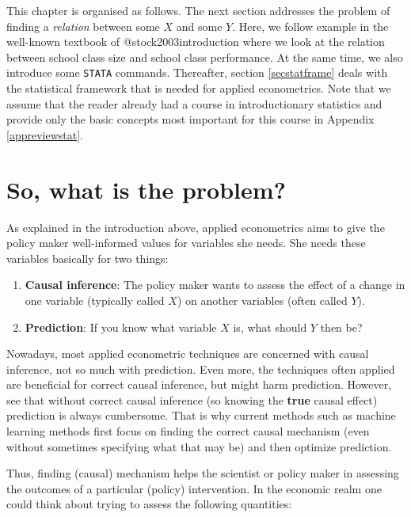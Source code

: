 \documentclass[
]{book}
\providecommand{\tightlist}{%
  \setlength{\itemsep}{0pt}\setlength{\parskip}{0pt}}
\begin{document}
This chapter is organised as follows. The next section addresses the problem of finding a \emph{relation} between some \(X\) and some \(Y\). Here, we follow example in the well-known textbook of @stock2003introduction where we look at the relation between school class size and school class performance. At the same time, we also introduce some \texttt{STATA} commands. Thereafter, section \ref{secstatframe} deals with the statistical framework that is needed for applied econometrics. Note that we assume that the reader already had a course in introductionary statistics and provide only the basic concepts most important for this course in Appendix \ref{appreviewstat}.

\hypertarget{secproblem}{%
\section{So, what is the problem?}\label{secproblem}}

As explained in the introduction above, applied econometrics aims to give the policy maker well-informed values for variables she needs. She needs these variables basically for two things:

\begin{enumerate}
\def\labelenumi{\arabic{enumi}.}
\tightlist
\item
  \textbf{Causal inference}: The policy maker wants to assess the effect of a change in one variable (typically called \(X\)) on another variables (often called \(Y\)).
\item
  \textbf{Prediction}: If you know what variable \(X\) is, what should \(Y\) then be?
\end{enumerate}

Nowadays, most applied econometric techniques are concerned with causal inference, not so much with prediction. Even more, the techniques often applied are beneficial for correct causal inference, but might harm prediction. However, see that without correct causal inference (so knowing the \textbf{true} causal effect) prediction is always cumbersome. That is why current methods such as machine learning methods first focus on finding the correct causal mechanism (even without sometimes specifying what that may be) and then optimize prediction.

Thus, finding (causal) mechanism helps the scientist or policy maker in assessing the outcomes of a particular (policy) intervention. In the economic realm one could think about trying to assess the following quantities:
\end{document}
